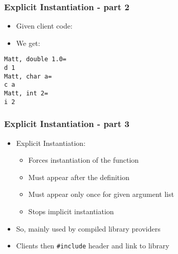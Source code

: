 \subsubsection{Explicit Instantiation - part
2}\label{explicit-instantiation---part-2}

\begin{itemize}
\itemsep1pt\parskip0pt
\item
  Given client code:
\end{itemize}

\begin{Shaded}
\begin{Highlighting}[]

  
\NormalTok{\{}
   
  \NormalTok{);}
   
   
  \NormalTok{);}
\NormalTok{\}}
\end{Highlighting}
\end{Shaded}

\begin{itemize}
\itemsep1pt\parskip0pt
\item
  We get:
\end{itemize}

\begin{verbatim}
Matt, double 1.0=
d 1
Matt, char a=
c a
Matt, int 2=
i 2
\end{verbatim}

\subsubsection{Explicit Instantiation - part
3}\label{explicit-instantiation---part-3}

\begin{itemize}
\itemsep1pt\parskip0pt
\item
  Explicit Instantiation:

  \begin{itemize}
  \itemsep1pt\parskip0pt
  \item
    Forces instantiation of the function
  \item
    Must appear after the definition
  \item
    Must appear only once for given argument list
  \item
    Stops implicit instantiation
  \end{itemize}
\item
  So, mainly used by compiled library providers
\item
  Clients then \texttt{\#include} header and link to library
\end{itemize}

